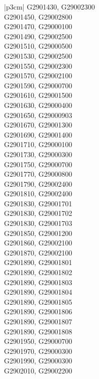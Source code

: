 \begin{customLongTable}{ |p{3cm}| }
G2901430, G29002300 \\ \hline
G2901450, G29002800 \\ \hline
G2901470, G29000100 \\ \hline
G2901490, G29002500 \\ \hline
G2901510, G29000500 \\ \hline
G2901530, G29002500 \\ \hline
G2901550, G29002300 \\ \hline
G2901570, G29002100 \\ \hline
G2901590, G29000700 \\ \hline
G2901610, G29001500 \\ \hline
G2901630, G29000400 \\ \hline
G2901650, G29000903 \\ \hline
G2901670, G29001300 \\ \hline
G2901690, G29001400 \\ \hline
G2901710, G29000100 \\ \hline
G2901730, G29000300 \\ \hline
G2901750, G29000700 \\ \hline
G2901770, G29000800 \\ \hline
G2901790, G29002400 \\ \hline
G2901810, G29002400 \\ \hline
G2901830, G29001701 \\ \hline
G2901830, G29001702 \\ \hline
G2901830, G29001703 \\ \hline
G2901850, G29001200 \\ \hline
G2901860, G29002100 \\ \hline
G2901870, G29002100 \\ \hline
G2901890, G29001801 \\ \hline
G2901890, G29001802 \\ \hline
G2901890, G29001803 \\ \hline
G2901890, G29001804 \\ \hline
G2901890, G29001805 \\ \hline
G2901890, G29001806 \\ \hline
G2901890, G29001807 \\ \hline
G2901890, G29001808 \\ \hline
G2901950, G29000700 \\ \hline
G2901970, G29000300 \\ \hline
G2901990, G29000300 \\ \hline
G2902010, G29002200 \\ \hline

\end{customLongTable}
